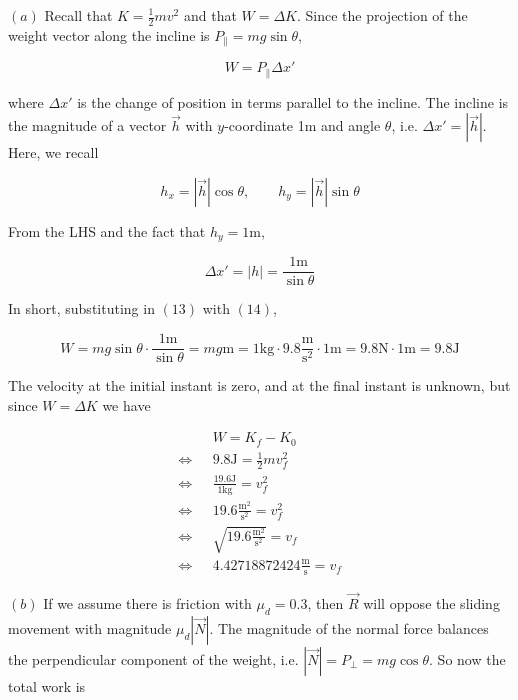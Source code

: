 \documentclass[12pt]{article}
\theoremstyle{definition}
\begin{document}
$(a)$ Recall that $K = \frac{1}{2}m v^2$ and that $W = \Delta K$. 
Since the
projection of the weight vector along the incline is $P_\parallel = mg \sin
\theta$,

\begin{equation}
    W = P_{\parallel} \Delta x'
\end{equation}

where $\Delta x'$ is the change of position in terms parallel to the incline.
The incline is the magnitude of a vector $\vec{h}$ with $y$-coordinate 1m and
angle $\theta$, i.e. $\Delta x' = \left| \vec{h} \right| $. Here, we recall 

\begin{equation*}
    h_x = \left| \vec{h} \right| \cos \theta, \qquad h_y = \left| \vec{h}
    \right|  \sin \theta
\end{equation*}

From the LHS and the fact that $h_y = 1\text{m}$,

\begin{equation*}
    \Delta x' = \left| h \right| = \frac{1\text{m}}{\sin \theta}
\end{equation*}

In short, substituting in $(13)$ with $(14)$,

\begin{equation}
    W = mg \sin \theta \cdot \frac{1\text{m}}{\sin \theta} = mg \text{m} =
    1\text{kg} \cdot 9.8 \frac{\text{m}}{\text{s}^2} \cdot 1\text{m} =
    9.8\text{N} \cdot 1 \text{m} = 9.8 \text{J}
\end{equation}

The velocity at the initial instant is zero, and at the final instant is
unknown, but since $W = \Delta K$ we have 

\begin{align*}
    &W = K_f - K_0 \\ 
    \iff ~ ~ ~
    &9.8\text{J} = \frac{1}{2}m v_f^2 \\ 
    \iff ~ ~ ~ 
    &\frac{ 19.6\text{J} }{1\text{kg}} = v_f^2 \\ 
    \iff ~ ~ ~ 
    &19.6 \frac{\text{m}^2}{\text{s}^2} = v_f^2 \\ 
    \iff ~ ~ ~ 
    &\sqrt{19.6 \frac{\text{m}^2}{\text{s}^2}}  = v_f \\
    \iff ~ ~ ~ 
    &4.42718872424 \frac{\text{m}}{\text{s}}  = v_f 
\end{align*}

$(b)$ If we assume there is friction with $\mu_d = 0.3$, then $\vec{R}$ will
oppose the sliding movement with magnitude $\mu_d \left| \vec{N} \right| $. The
magnitude of the normal force balances the perpendicular component of the
weight, i.e. $\left| \vec{N} \right| = P_\perp = mg \cos \theta$. So now the
total work is 
\end{document}
